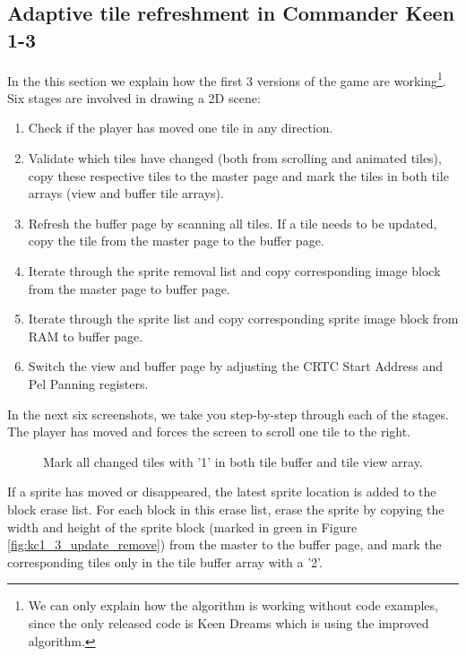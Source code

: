 \documentclass[book.tex]{subfiles}
\begin{document}
\subsection{Adaptive tile refreshment in Commander Keen 1-3}
In the this section we explain how the first 3 versions of the game are working\footnote{We can only explain how the algorithm is working without code examples, since the only released code is Keen Dreams which is using the improved algorithm.}. Six stages are involved in drawing a 2D scene:
\begin{enumerate}
\item Check if the player has moved one tile in any direction.
\item Validate which tiles have changed (both from scrolling and animated tiles), copy these respective tiles to the master page and mark the tiles in both tile arrays (view and buffer tile arrays).
\item Refresh the buffer page by scanning all tiles. If a tile needs to be updated, copy the tile from the master page to the buffer page.
\item Iterate through the sprite removal list and copy corresponding image block from the master page to buffer page. 
\item Iterate through the sprite list and copy corresponding sprite image block from RAM to buffer page.
\item Switch the view and buffer page by adjusting the CRTC Start Address and Pel Panning registers.
\end{enumerate}



In the next six screenshots, we take you step-by-step through each of the stages. The player has moved and forces the screen to scroll one tile to the right. \\

\begin{figure}[H]
\centering
 \caption{Mark all changed tiles with '1' in both tile buffer and tile view array.}
 \label{fig:kc1_3_update_refresh_img_1}
\end{figure}


\par
If a sprite has moved or disappeared, the latest sprite location is added to the block erase list. For each block in this erase list, erase the sprite by copying the width and height of the sprite block (marked in green in Figure \ref{fig:kc1_3_update_remove}) from the master to the buffer page, and mark the corresponding tiles only in the tile buffer array with a '2'.
\end{document}
